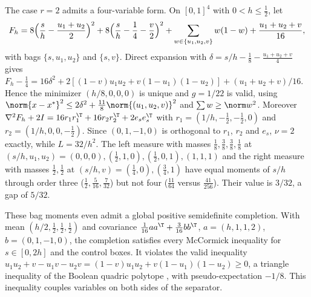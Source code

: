 \begin{remark}\label{lim:rem:moments}
The case $r=2$ admits a four-variable form. On $[0,1]^4$ with
$0<h\le\frac12$, let
\[
F_h=8\Bigl(\frac sh-\frac{u_1+u_2}2\Bigr)^2+8\Bigl(\frac sh-\frac14-\frac v2
\Bigr)^2+\sum_{w\in\{u_1,u_2,v\}}w(1-w)+\frac{u_1+u_2+v}{16},
\]
with bags $\{s,u_1,u_2\}$ and $\{s,v\}$. Direct expansion with
$\delta=s/h-\frac18-\frac{u_1+u_2+v}4$ gives
$F_h-\frac14=16\delta^2+2[(1-v)u_1u_2+v(1-u_1)(1-u_2)]+(u_1+u_2+v)/16$.
Hence the minimizer $(h/8,0,0,0)$ is unique and $g=1/22$ is valid, using
$\norm{x-x^*}^2\le2\delta^2+\frac{11}8\norm{(u_1,u_2,v)}^2$ and
$\sum w\ge\norm w^2$. Moreover $\nabla^2F_h+2I=16r_1r_1^{\T}+
16r_2r_2^{\T}+2e_se_s^{\T}$ with $r_1=(1/h,-\frac12,-\frac12,0)$
and $r_2=(1/h,0,0,-\frac12)$. Since $(0,1,-1,0)$ is orthogonal to $r_1$, $r_2$
and $e_s$, $\nu=2$ exactly, while $L=32/h^2$. The left measure with masses
$\frac18,\frac38,\frac38,\frac18$ at $(s/h,u_1,u_2)=(0,0,0),(\frac12,1,0),
(\frac12,0,1),(1,1,1)$ and the right measure with masses $\frac12,\frac12$
at $(s/h,v)=(\frac14,0),(\frac34,1)$ have equal moments of $s/h$ through order
three ($\frac12,\frac5{16},\frac7{32}$) but not four ($\frac{11}{64}$ versus
$\frac{41}{256}$). Their value is $3/32$, a gap of $5/32$.

These bag moments even admit a global positive semidefinite completion.
With mean $(h/2,\frac12,\frac12,\frac12)$ and covariance
$\frac1{16}aa^{\T}+\frac3{16}bb^{\T}$, $a=(h,1,1,2)$,
$b=(0,1,-1,0)$, the completion satisfies every McCormick inequality for
$s\in[0,2h]$ and the control boxes. It violates the valid inequality
$u_1u_2+v-u_1v-u_2v=(1-v)u_1u_2+v(1-u_1)(1-u_2)\ge0$, a triangle inequality
of the Boolean quadric polytope \cite{Padberg1989}, with pseudo-expectation
$-1/8$. This inequality couples variables on both sides of the separator.
\end{remark}
